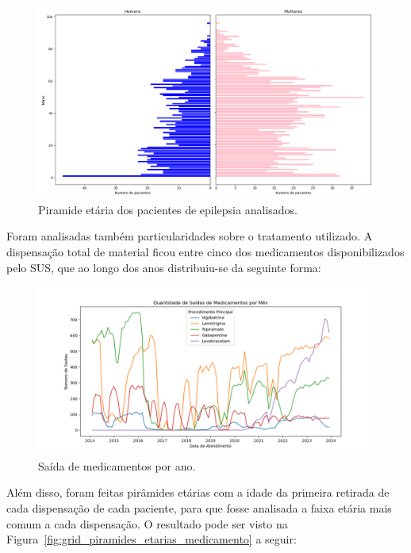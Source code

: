 \documentclass[article,a4paper,12pt,brazil,sumario=tradicional]{abntex2}
\begin{document}
\begin{figure}[ht!]
    \centering
    \includegraphics[width=1\textwidth]{piramide_etaria_completa.png}
    \caption{Piramide etária dos pacientes de epilepsia analisados.}
    \label{fig:piramide_etaria_completa}
\end{figure}

Foram analisadas também particularidades sobre o tratamento utilizado. A dispensação total de material ficou entre cinco dos medicamentos disponibilizados pelo SUS, que ao longo dos anos distribuiu-se da seguinte forma:

\begin{figure}[!ht]
    \centering
    \includegraphics[width=1\textwidth]{saida_medicamentos_por_mes.png}
    \caption{Saída de medicamentos por ano.}
    \label{fig:saida_medicamentos_por_mes}
\end{figure}

Além disso, foram feitas pirâmides etárias com a idade da primeira retirada de cada dispensação de cada paciente, para que fosse analisada a faixa etária mais comum a cada dispensação. O resultado pode ser visto na Figura~\ref{fig:grid_piramides_etarias_medicamento} a seguir:
\end{document}
